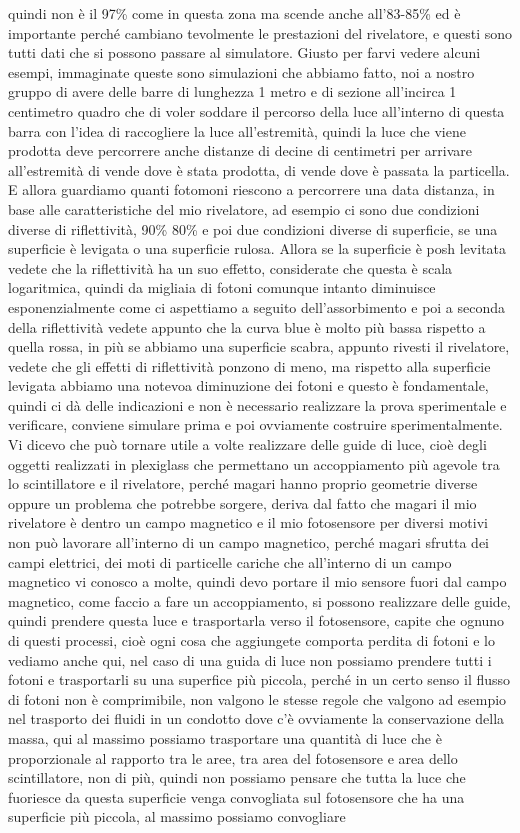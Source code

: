 quindi non è il 97\% come in questa zona ma scende anche all'83-85\% ed è importante perché cambiano tevolmente le prestazioni del rivelatore, e questi sono tutti dati che si possono passare al simulatore. Giusto per farvi vedere alcuni esempi, immaginate queste sono simulazioni che abbiamo fatto, noi a nostro gruppo di avere delle barre di lunghezza 1 metro e di sezione all'incirca 1 centimetro quadro che di voler soddare il percorso della luce all'interno di questa barra con l'idea di raccogliere la luce all'estremità, quindi la luce che viene prodotta deve percorrere anche distanze di decine di centimetri per arrivare all'estremità di vende dove è stata prodotta, di vende dove è passata la particella. E allora guardiamo quanti fotomoni riescono a percorrere una data distanza, in base alle caratteristiche del mio rivelatore, ad esempio ci sono due condizioni diverse di riflettività, 90\% 80\% e poi due condizioni diverse di superficie, se una superficie è levigata o una superficie rulosa. Allora se la superficie è posh levitata vedete che la riflettività ha un suo effetto, considerate che questa è scala logaritmica, quindi da migliaia di fotoni comunque intanto diminuisce esponenzialmente come ci aspettiamo a seguito dell'assorbimento e poi a seconda della riflettività vedete appunto che la curva blue è molto più bassa rispetto a quella rossa, in più se abbiamo una superficie scabra, appunto rivesti il rivelatore, vedete che gli effetti di riflettività ponzono di meno, ma rispetto alla superficie levigata abbiamo una notevoa diminuzione dei fotoni e questo è fondamentale, quindi ci dà delle indicazioni e non è necessario realizzare la prova sperimentale e verificare, conviene simulare prima e poi ovviamente costruire sperimentalmente. Vi dicevo che può tornare utile a volte realizzare delle guide di luce, cioè degli oggetti realizzati in plexiglass che permettano un accoppiamento più agevole tra lo scintillatore e il rivelatore, perché magari hanno proprio geometrie diverse oppure un problema che potrebbe sorgere, deriva dal fatto che magari il mio rivelatore è dentro un campo magnetico e il mio fotosensore per diversi motivi non può lavorare all'interno di un campo magnetico, perché magari sfrutta dei campi elettrici, dei moti di particelle cariche che all'interno di un campo magnetico vi conosco a molte, quindi devo portare il mio sensore fuori dal campo magnetico, come faccio a fare un accoppiamento, si possono realizzare delle guide, quindi prendere questa luce e trasportarla verso il fotosensore, capite che ognuno di questi processi, cioè ogni cosa che aggiungete comporta perdita di fotoni e lo vediamo anche qui, nel caso di una guida di luce non possiamo prendere tutti i fotoni e trasportarli su una superfice più piccola, perché in un certo senso il flusso di fotoni non è comprimibile, non valgono le stesse regole che valgono ad esempio nel trasporto dei fluidi in un condotto dove c'è ovviamente la conservazione della massa, qui al massimo possiamo trasportare una quantità di luce che è proporzionale al rapporto tra le aree, tra area del fotosensore e area dello scintillatore, non di più, quindi non possiamo pensare che tutta la luce che fuoriesce da questa superficie venga convogliata sul fotosensore che ha una superficie più piccola, al massimo possiamo convogliare 